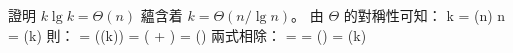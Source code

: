 \startEXERCISE
證明 $k\lg k = \Theta(n)$ 蘊含着 $k = \Theta(n/\lg n)$。
\stopEXERCISE
\startANSWER
由 $\Theta$ 的對稱性可知：
\startformula
k = \Theta(n) \Rightarrow n = \Theta(k)
\stopformula
則：
\startsplitformula\startmathalignment
\NC {}
    \NC = \Theta(\lg(k)) \NR
\NC \NC = \Theta( + \lg{}) \NR
\NC \NC = \Theta() \NR
\stopmathalignment\stopsplitformula
兩式相除：
\startsplitformula\startmathalignment
\NC \NC {} \NR
\NC = \NC {} \NR
\NC = \NC \Theta() \NR
\NC = \NC \Theta(k) \NR
\stopmathalignment\stopsplitformula
\stopANSWER
